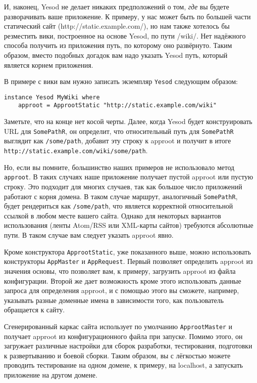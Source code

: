 И, наконец, Yesod не делает никаких предположений о том, \emph{где} вы будете разворачивать ваше приложение. К примеру, у нас может быть по большей части статический сайт (http://static.example.com/), но нам также хотелось бы резместить вики, построенное на основе Yesod, по пути /wiki/. Нет надёжного способа получить из приложения путь, по которому оно развёрнуто. Таким образом, вместо подобных догадок вам надо указать Yesod путь, который является корнем приложения.

В примере с вики вам нужно записать экземпляр \lstinline!Yesod! следующим образом:

\begin{lstlisting}
instance Yesod MyWiki where
    approot = ApprootStatic "http://static.example.com/wiki"
\end{lstlisting}

Заметьте, что на конце нет косой черты. Далее, когда Yesod будет конструировать URL для \lstinline!SomePathR!, он определит, что относительный путь для \lstinline!SomePathR! выглядит как \lstinline!/some/path!, добавит эту строку к approot и получит в итоге \lstinline!http://static.example.com/wiki/some/path!.

Но, если вы помните, большинство наших примеров не использовало метод \lstinline!approot!. В таких случаях наше приложение получает пустой approot или пустую строку. Это подходит для многих случаев, так как большое число приложений работают с корня домена. В таком случае маршрут, аналогичный \lstinline!SomePathR!, будет рендериться как \lstinline!/some/path!, что является корректной относительной ссылкой в любом месте вашего сайта. Однако для некоторых вариантов использования (ленты Atom/RSS или XML-карты сайтов) требуются абсолютные пути. В таком случае вам следует указать approot явно.

Кроме конструктора \lstinline!ApprootStatic!, уже показанного выше, можно использовать конструкторы \lstinline!AppMaster! и \lstinline!AppRequest!. Первый позволяет определить approot из значения основы, что позволяет вам, к примеру, загрузить approot из файла конфигурации. Второй же дает возможность кроме этого использовать данные запроса для определения approot, и с помощью этого вы сможете, например, указывать разные доменные имена в зависимости того, как пользователь обращается к сайту.

Сгенерированный каркас сайта использует по умолчанию \lstinline!ApprootMaster! и получает approot из конфигурационного файла при запуске. Помимо этого, он загружает различные настройки для сборок разработки, тестирования, подготовки к развертыванию и боевой сборки. Таким образом, вы с лёгкостью можете проводить тестирование на одном домене, к примеру, на localhost, а запускать приложение на другом домене.


